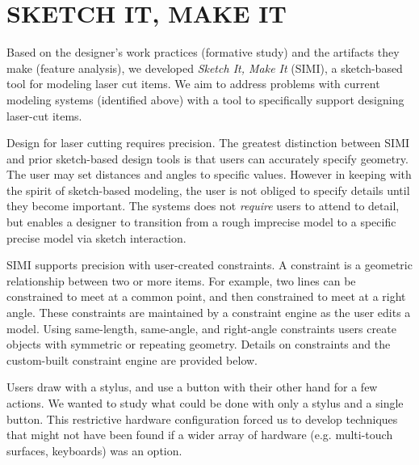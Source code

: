 \documentclass{article}
\begin{document}


\section{SKETCH IT, MAKE IT}

Based on the designer's work practices (formative study) and the
artifacts they make (feature analysis), we developed \textit{Sketch
  It, Make It} (SIMI), a sketch-based tool for modeling laser cut
items. We aim to address problems with current modeling systems
(identified above) with a tool to specifically support designing
laser-cut items.

Design for laser cutting requires precision. The greatest distinction
between SIMI and prior sketch-based design tools is that users can
accurately specify geometry. The user may set distances and angles to
specific values. However in keeping with the spirit of sketch-based
modeling, the user is not obliged to specify details until they become
important. The systems does not \textit{require} users to attend to
detail, but enables a designer to transition from a rough imprecise
model to a specific precise model via sketch interaction.

SIMI supports precision with user-created constraints. A constraint is
a geometric relationship between two or more items. For example, two
lines can be constrained to meet at a common point, and then
constrained to meet at a right angle. These constraints are maintained
by a constraint engine as the user edits a model. Using same-length,
same-angle, and right-angle constraints users create objects with
symmetric or repeating geometry. Details on constraints and the
custom-built constraint engine are provided below.

Users draw with a stylus, and use a button with their other hand for a
few actions. We wanted to study what could be done with only a stylus
and a single button. This restrictive hardware configuration forced us
to develop techniques that might not have been found if a wider array
of hardware (e.g. multi-touch surfaces, keyboards) was an option.
\end{document}
